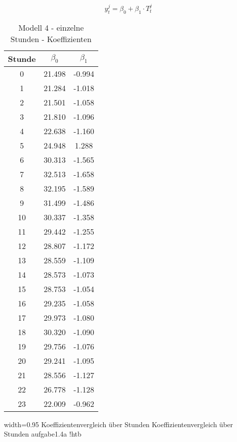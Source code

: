 \documentclass{eegreport}
\begin{document}
\begin{equation}\label{Gleichung Modell 3}
y_t^j = \beta_0 + \beta_1 \cdot T_t^j
\end{equation}
\newpage
\begin{table}[!h]
\begin{center}
\begin{tabular}{|c|c|c|}
\hline 
Stunde  & $\beta_0$ & $\beta_1$ \\ 
\hline 
0 & 21.498 & -0.994 \\ 
\hline 
1 & 21.284 & -1.018 \\ 
\hline 
2 & 21.501 & -1.058 \\ 
\hline 
3 & 21.810 & -1.096 \\ 
\hline 
4 & 22.638 & -1.160 \\ 
\hline 
5 & 24.948 & 1.288 \\ 
\hline 
6 & 30.313 & -1.565 \\ 
\hline 
7 & 32.513 & -1.658 \\ 
\hline 
8 & 32.195 & -1.589 \\ 
\hline 
9 & 31.499 & -1.486 \\ 
\hline 
10 & 30.337 & -1.358 \\ 
\hline 
11 & 29.442 & -1.255 \\ 
\hline 
12 & 28.807 & -1.172 \\ 
\hline 
13 & 28.559 & -1.109 \\ 
\hline 
14 & 28.573 & -1.073 \\ 
\hline 
15 & 28.753 & -1.054 \\ 
\hline 
16 & 29.235 & -1.058 \\ 
\hline 
17 & 29.973 & -1.080 \\ 
\hline 
18 & 30.320 & -1.090 \\ 
\hline 
19 & 29.756 & -1.076 \\ 
\hline 
20 & 29.241 & -1.095 \\ 
\hline 
21 & 28.556 & -1.127 \\ 
\hline 
22 & 26.778 & -1.128 \\ 
\hline 
23 & 22.009 & -0.962 \\ 
\hline 
\end{tabular} 
\end{center}
\caption{Modell 4 - einzelne Stunden - Koeffizienten}
\label{tab4a}
\end{table}

\newpage
{}
{width=0.95\textwidth}
{Koeffizientenvergleich über Stunden}
{Koeffizientenvergleich über Stunden}
{aufgabe1.4a}
{!htb}
\end{document}
